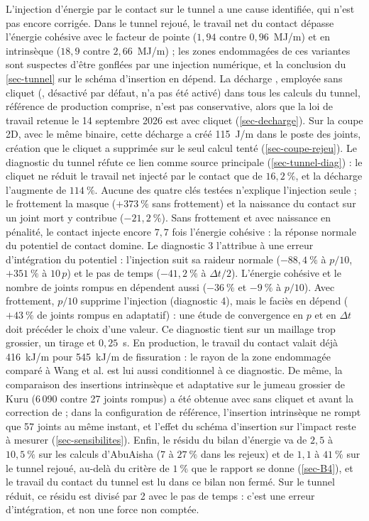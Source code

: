 L'injection d'énergie par le contact sur le tunnel a une cause identifiée, qui n'est pas encore corrigée. Dans le tunnel rejoué, le travail net du contact dépasse l'énergie cohésive avec le facteur de pointe ($1{,}94$ contre $0{,}96$~MJ/m) et en intrinsèque ($18{,}9$ contre $2{,}66$~MJ/m) ; les zones endommagées de ces variantes sont suspectes d'être gonflées par une injection numérique, et la conclusion du \cref{sec-tunnel} sur le schéma d'insertion en dépend. La décharge , employée sans cliquet (, désactivé par défaut, n'a pas été activé) dans tous les calculs du tunnel, référence de production comprise, n'est pas conservative, alors que la loi de travail retenue le 14 septembre 2026 est  avec cliquet (\cref{sec-decharge}). Sur la coupe 2D, avec le même binaire, cette décharge a créé 115~J/m dans le poste des joints, création que le cliquet a supprimée sur le seul calcul tenté (\cref{sec-coupe-rejeu}). Le diagnostic du tunnel réfute ce lien comme source principale (\cref{sec-tunnel-diag}) : le cliquet ne réduit le travail net injecté par le contact que de $16{,}2~\%$, et la décharge  l'augmente de $114~\%$. Aucune des quatre clés testées n'explique l'injection seule ; le frottement la masque ($+373~\%$ sans frottement) et la naissance du contact sur un joint mort y contribue ($-21{,}2~\%$). Sans frottement et avec naissance en pénalité, le contact injecte encore $7{,}7$ fois l'énergie cohésive : la réponse normale du potentiel de contact domine. Le diagnostic 3 l'attribue à une erreur d'intégration du potentiel : l'injection suit sa raideur normale ($-88{,}4~\%$ à $p/10$, $+351~\%$ à $10\,p$) et le pas de temps ($-41{,}2~\%$ à $\Delta t/2$). L'énergie cohésive et le nombre de joints rompus en dépendent aussi ($-36~\%$ et $-9~\%$ à $p/10$). Avec frottement, $p/10$ supprime l'injection (diagnostic 4), mais le faciès en dépend ($+43~\%$ de joints rompus en adaptatif) : une étude de convergence en $p$ et en $\Delta t$ doit précéder le choix d'une valeur. Ce diagnostic tient sur un maillage trop grossier, un tirage et $0{,}25$~s. En production, le travail du contact valait déjà 416~kJ/m pour 545~kJ/m de fissuration : le rayon de la zone endommagée comparé à Wang et al. est lui aussi conditionnel à ce diagnostic. De même, la comparaison des insertions intrinsèque et adaptative sur le jumeau grossier de Kuru (6\,090 contre 27 joints rompus) a été obtenue avec  sans cliquet et avant la correction de  ; dans la configuration de référence, l'insertion intrinsèque ne rompt que 57 joints au même instant, et l'effet du schéma d'insertion sur l'impact reste à mesurer (\cref{sec-sensibilites}). Enfin, le résidu du bilan d'énergie va de $2{,}5$ à $10{,}5~\%$ sur les calculs d'AbuAisha (7 à $27~\%$ dans les rejeux) et de $1{,}1$ à $41~\%$ sur le tunnel rejoué, au-delà du critère de $1~\%$ que le rapport se donne (\cref{sec-B4}), et le travail du contact du tunnel est lu dans ce bilan non fermé. Sur le tunnel réduit, ce résidu est divisé par 2 avec le pas de temps : c'est une erreur d'intégration, et non une force non comptée.


